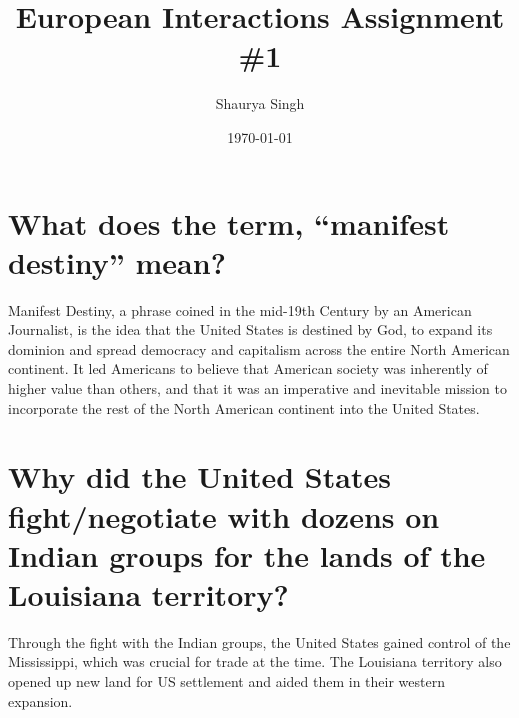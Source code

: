 \documentclass{scrartcl}
\author{Shaurya Singh}
\date{\today}
\title{European Interactions Assignment \#1}
\begin{document}
\maketitle

\section{What does the term, ``manifest destiny'' mean?}
\label{sec:org42c5950}
Manifest Destiny, a phrase coined in the mid-19th Century by an American
Journalist, is the idea that the United States is destined by God, to expand its
dominion and spread democracy and capitalism across the entire North American
continent. It led Americans to believe that American society was inherently of
higher value than others, and that it was an imperative and inevitable mission
to incorporate the rest of the North American continent into the United States.

\section{Why did the United States fight/negotiate with dozens on Indian groups for the lands of the Louisiana territory?}
\label{sec:org537c3d7}
Through the fight with the Indian groups, the United States gained control of
the Mississippi, which was crucial for trade at the time. The Louisiana
territory also opened up new land for US settlement and aided them in their
western expansion.
\end{document}
